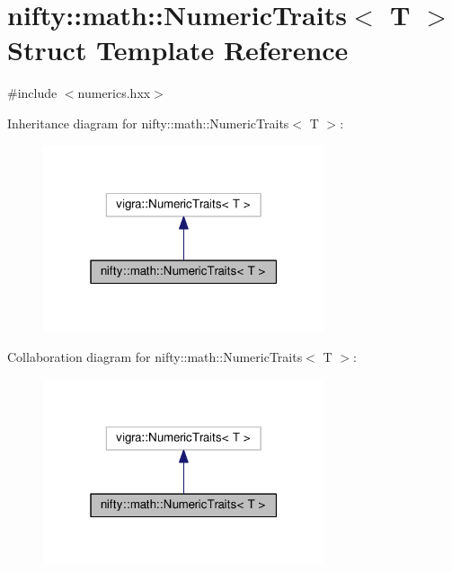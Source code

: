 \hypertarget{structnifty_1_1math_1_1NumericTraits}{}\section{nifty\+:\+:math\+:\+:Numeric\+Traits$<$ T $>$ Struct Template Reference}
\label{structnifty_1_1math_1_1NumericTraits}


{\ttfamily \#include $<$numerics.\+hxx$>$}



Inheritance diagram for nifty\+:\+:math\+:\+:Numeric\+Traits$<$ T $>$\+:\nopagebreak
\begin{figure}[H]
\begin{center}
\leavevmode
\includegraphics[width=235pt]{structnifty_1_1math_1_1NumericTraits__inherit__graph}
\end{center}
\end{figure}


Collaboration diagram for nifty\+:\+:math\+:\+:Numeric\+Traits$<$ T $>$\+:\nopagebreak
\begin{figure}[H]
\begin{center}
\leavevmode
\includegraphics[width=235pt]{structnifty_1_1math_1_1NumericTraits__coll__graph}
\end{center}
\end{figure}
